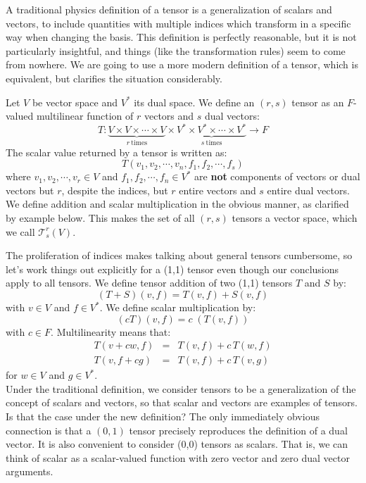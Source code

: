 \documentclass[12pt]{article}
\begin{document}
A traditional physics definition of a tensor is a generalization of
scalars and vectors, to include quantities with multiple indices which
transform in a specific way when changing the basis.  This definition
is perfectly reasonable, but it is not particularly insightful, and
things (like the transformation rules) seem to come from nowhere.  We
are going to use a more modern definition of a tensor, which is
equivalent, but clarifies the situation considerably.

Let $V$ be vector space and $V^*$ its dual space.  We define an $(r,s)$ tensor as an $F$-valued multilinear function of $r$ vectors and $s$ dual vectors:
\begin{displaymath}
  T:\underbrace{V \times V \times \cdots \times V}_{r~\text{times}} \times \underbrace{V^* \times V^* \times \cdots \times V^*}_{s~\text{times}} \to F
\end{displaymath}
The scalar value returned by a tensor is written as:
$$T(v_1,v_2,\cdots,v_n,f_1,f_2,\cdots,f_s)$$
where $v_1,v_2,\cdots,v_r \in V$ and $f_1,f_2,\cdots,f_n \in V^*$ are
{\bf not} components of vectors or dual vectors but $r$, despite the
indices, but $r$ entire vectors and $s$ entire dual vectors.  We
define addition and scalar multiplication in the obvious manner, as
clarified by example below.  This makes the set of all $(r,s)$ tensors
a vector space, which we call $\mathcal{T}^r_s(V)$.

The proliferation of indices makes talking about general tensors
cumbersome, so let's work things out explicitly for a (1,1) tensor
even though our conclusions apply to all tensors.  We define tensor
addition of two (1,1) tensors $T$ and $S$ by:
$$(T+S)(v,f) = T(v,f) + S(v,f)$$
with $v \in V$ and $f \in V^*$.  We define scalar multiplication by:
$$(cT)(v,f) = c \; (T(v,f))$$
with $c \in F$.  Multilinearity means that:
\begin{eqnarray*}
  T(v+cw,f) &=& T(v,f) + c \, T(w,f) \\
  T(v,f+cg) &=& T(v,f) + c \, T(v,g)
\end{eqnarray*}
for $w \in V$ and $g \in V^*$.\\[3pt]

\noindent
Under the traditional definition, we consider tensors to be a
generalization of the concept of scalars and vectors, so that scalar
and vectors are examples of tensors.  Is that the case under the new
definition?  The only immediately obvious connection is that a $(0,1)$
tensor precisely reproduces the definition of a dual vector.  It is
also convenient to consider (0,0) tensors as scalars.  That is, we can
think of scalar as a scalar-valued function with zero vector and zero dual
vector arguments.\\[3pt]
\end{document}
